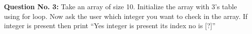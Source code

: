 \documentclass{article}
\begin{document}
\begin{figure}[H]
%
%	
\end{figure}
\textbf{Question No. 3:} Take an array of size 10. Initialize the array with 3's table using for loop. Now ask the user which integer you want to check in the array. If integer is present then print ``Yes integer is present its index no is [?]''\\
\end{document}
